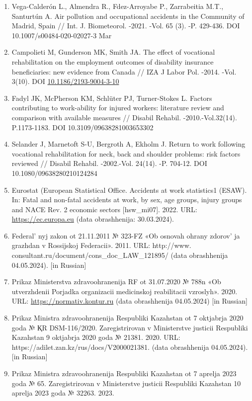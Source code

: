 \begin{references}
\begin{enumerate}
\def\labelenumi{\arabic{enumi}.}
\setcounter{enumi}{5}
\item
  Vega-Calderón L., Almendra R., Fdez-Arroyabe P., Zarrabeitia M.T.,
  Santurtún A. Air pollution and occupational accidents in the Community
  of Madrid, Spain // Int. J. Biometeorol. -2021. -Vol. 65 (3). -P.
  429-436. DOI 10.1007/s00484-020-02027-3 Mar
\item
  Campolieti M, Gunderson MK, Smith JA. The effect of vocational
  rehabilitation on the employment outcomes of disability insurance
  beneficiaries: new evidence from Canada // IZA J Labor Pol. -2014.
  -Vol. 3(10). DOI
  \href{http://dx.doi.org/10.1186/2193-9004-3-10}{10.1186/2193-9004-3-10}
\item
  Fadyl JK, McPherson KM, Schlüter PJ, Turner-Stokes L. Factors
  contributing to work-ability for injured workers: literature review
  and comparison with available measures // Disabil Rehabil.
  -2010.-Vol.32(14). P.1173-1183. DOI 10.3109/09638281003653302
\item
  Selander J, Marnetoft S-U, Bergroth A, Ekholm J. Return to work
  following vocational rehabilitation for neck, back and shoulder
  problems: risk factors reviewed // Disabil Rehabil. -2002.-Vol.
  24(14). -P. 704-12. DOI 10.1080/09638280210124284
\item
  Eurostat (European Statistical Office. Accidents at work statistics1
  (ESAW). In: Fatal and non-fatal accidents at work, by sex, age groups,
  injury groups and NACE Rev. 2 economic sectors {[}hsw\_mi07{]}. 2022.
  URL:
  \href{https://ec.europa.eu/eurostat/web/main/search/-/search/estatsearchportlet\_WAR\_estatsearchportlet\_INSTANCE\_bHVzuvn1SZ8J?\_estatsearchportlet\_WAR\_estatsearchportlet\_INSTANCE\_bHVzuvn1SZ8J\_pageNumber=1\&\_estatsearchportlet\_WAR\_estatsearchportlet\_INSTANCE\_bHVzuvn1SZ8J\_pageSize=11\&text=fatal+and+non-fatal+accidents+at+work\%2C+by+sex\%2C+age+groups\%2C+injury+}{https://ec.europa.eu}
  (data obrashhenija: 30.03.2024).
\item
  Federal' nyj zakon ot 21.11.2011 № 323-FZ «Ob osnovah
  ohrany zdorov' ja grazhdan v Rossijskoj Federacii».
  2011. URL: http://www. consultant.ru/document/cons\_doc\_LAW\_121895/
  (data obrashhenija 04.05.2024). {[}in Russian{]}
\item
  Prikaz Ministerstva zdravoohranenija RF ot 31.07.2020 № 788n «Ob
  utverzhdenii Porjadka organizacii medicinskoj reabilitacii vzroslyh».
  2020. URL:
  \href{https://normativ.kontur.ru/document?moduleId=1\&documentId=438476}{https://normativ.kontur.ru}
  (data obrashhenija 04.05.2024) {[}in Russian{]}
\item
  Prikaz Ministra zdravoohranenija Respubliki Kazahstan ot 7 oktjabrja
  2020 goda № ҚR DSM-116/2020. Zaregistrirovan v Ministerstve justicii
  Respubliki Kazahstan 9 oktjabrja 2020 goda № 21381. 2020. URL:
  https://adilet.zan.kz/rus/docs/V2000021381. (data obrashhenija
  04.05.2024). {[}in Russian{]}
\item
  Prikaz Ministra zdravoohranenija Respubliki Kazahstan ot 7 aprelja
  2023 goda № 65. Zaregistrirovan v Ministerstve justicii Respubliki
  Kazahstan 10 aprelja 2023 goda № 32263. 2023. 
  

\end{enumerate}
\end{references}
